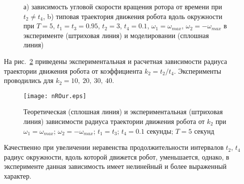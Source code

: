 \begin{figure}[!ht]
	\begin{minipage}[h]{0.5\linewidth}
	\end{minipage}
	\hfill
	\begin{minipage}[h]{0.5\linewidth}
	\end{minipage}
	\caption{а) зависимость угловой скорости вращения ротора от времени при $t_2  \neq t_4$, b) типовая траектория движения робота вдоль окружности при $T = 5$, $t_1 = t_3 = 0.95$, $t_2 = 3$, $t_4 = 0.1$, $\omega_1 = \omega_{max}$, $\omega_2 = -\omega_{max}$ в эксперименте (штриховая линия) и моделировании (сплошная линия)}
	\label{ControlActionOur}
\end{figure}


На рис.~\ref{nROur} приведены экспериментальная и расчетная зависимости радиуса траектории движения робота от коэффициента $k_2 = t_2 / t_4$. Эксперименты проводились для $k_2 = 10,\ 20,\ 30,\ 40$.

\begin{figure}[!ht]
	\centering
	\texttt{[image: nROur.eps]}
	\caption{Теоретическая (сплошная линия) и экспериментальная (штриховая линия) зависимости радиуса траектории движения робота от $k_2$ при $\omega_1 = \omega_{max} $; $ \omega_2 = -\omega_{max} $; $ t_1=t_3 $; $ t_4=0.1 $ секунды; $ T = 5 $ секунд}
	\label{nROur}
\end{figure}

Качественно при увеличении неравенства продолжительности интервалов $t_2$, $t_4$ радиус окружности, вдоль которой движется робот, уменьшается, однако, в эксперименте данная зависимость имеет нелинейный и более выраженный характер.

